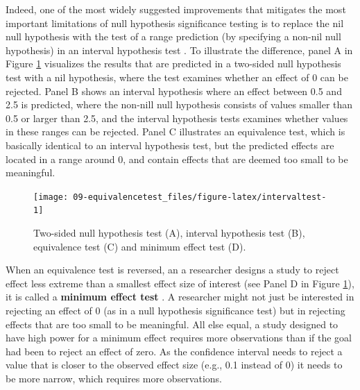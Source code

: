 \documentclass[
  oneside]{book}
\begin{document}
Indeed, one of the most widely suggested improvements that mitigates the most important limitations of null hypothesis significance testing is to replace the nil null hypothesis with the test of a range prediction (by specifying a non-nil null hypothesis) in an interval hypothesis test \citep{lakens_practical_2021}. To illustrate the difference, panel A in Figure \ref{fig:intervaltest} visualizes the results that are predicted in a two-sided null hypothesis test with a nil hypothesis, where the test examines whether an effect of 0 can be rejected. Panel B shows an interval hypothesis where an effect between 0.5 and 2.5 is predicted, where the non-nill null hypothesis consists of values smaller than 0.5 or larger than 2.5, and the interval hypothesis tests examines whether values in these ranges can be rejected. Panel C illustrates an equivalence test, which is basically identical to an interval hypothesis test, but the predicted effects are located in a range around 0, and contain effects that are deemed too small to be meaningful.



\begin{figure}

{\centering \texttt{[image: 09-equivalencetest\_files/figure-latex/intervaltest-1]} 

}

\caption{Two-sided null hypothesis test (A), interval hypothesis test (B), equivalence test (C) and minimum effect test (D).}\label{fig:intervaltest}
\end{figure}

When an equivalence test is reversed, an a researcher designs a study to reject effect less extreme than a smallest effect size of interest (see Panel D in Figure \ref{fig:intervaltest}), it is called a \textbf{minimum effect test} \citep{murphy_testing_1999}. A researcher might not just be interested in rejecting an effect of 0 (as in a null hypothesis significance test) but in rejecting effects that are too small to be meaningful. All else equal, a study designed to have high power for a minimum effect requires more observations than if the goal had been to reject an effect of zero. As the confidence interval needs to reject a value that is closer to the observed effect size (e.g., 0.1 instead of 0) it needs to be more narrow, which requires more observations.
\end{document}
